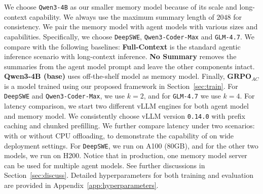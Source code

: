 We choose \texttt{Qwen3-4B} as our smaller memory model because of its scale and long-context capability.
We always use the maximum summary length of $2048$ for consistency.
We pair the memory model with agent models with various sizes and capabilities.
Specifically, we choose \texttt{DeepSWE}, \texttt{Qwen3-Coder-Max} and \texttt{GLM-4.7}.
We compare with the following baselines: \textbf{Full-Context} is the standard agentic inference scenario with long-context inference. \textbf{No Summary} removes the summaries from the agent model prompt and leave the other components intact. \textbf{Qwen3-4B (base)} uses off-the-shelf model as memory model. Finally, $\textbf{GRPO}_{AC}$ is a model trained using our proposed framework in Section~\ref{sec:train}.
For \texttt{DeepSWE} and \texttt{Qwen3-Coder-Max}, we use $k=2$, and for \texttt{GLM-4.7} we use $k=4$.
For latency comparison, we start two different vLLM engines for both agent model and memory model. We consistently choose vLLM version \texttt{0.14.0} with prefix caching and chunked prefilling. We further compare latency under two scenarios: with or without CPU offloading, to demonstrate the capability of \model on wide deployment settings.
For \texttt{DeepSWE}, we run on A100 (80GB), and for the other two models, we run on H200.
Notice that in production, one memory model server can be used for multiple agent models. See further discussions in Section~\ref{sec:discuss}. Detailed hyperparameters for both training and evaluation are provided in Appendix~\ref{app:hyperparameters}.